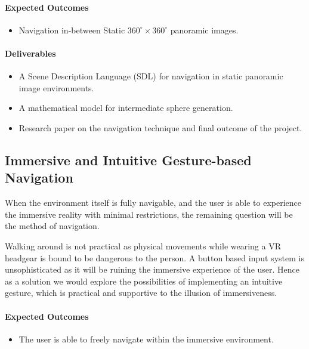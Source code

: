 \paragraph{\textbf{Expected Outcomes}}
\begin{itemize}
\item{Navigation in-between Static $360^{\circ}\times360^{\circ}$ panoramic images.}
\end{itemize}

\paragraph{\textbf{Deliverables}}
\begin{itemize}
\item{A Scene Description Language (SDL) for navigation in static panoramic image environments.}
\item{A mathematical model for intermediate sphere generation.}
\item{Research paper on the navigation technique and final outcome of the project.}
\end{itemize}

\subsection{Immersive and Intuitive Gesture-based Navigation}
\label{intro_subsec:3_4}

When the environment itself is fully navigable, and the user is able to experience the immersive reality with minimal restrictions, the remaining question will be the method of navigation.

Walking around is not practical as physical movements while wearing a VR headgear is bound to be dangerous to the person. A button based input system is unsophisticated as it will be ruining the immersive experience of the user. Hence as a solution we would explore the possibilities of implementing an intuitive gesture, which is practical and supportive to the illusion of immersiveness.

\paragraph{\textbf{Expected Outcomes}}
\begin{itemize}
\item{The user is able to freely navigate within the immersive environment.}
\end{itemize}

